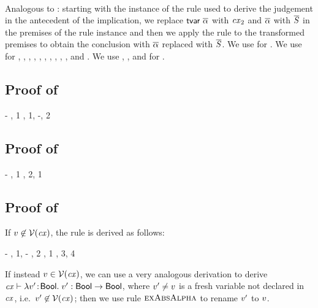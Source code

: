 \begin{bycase}
\Case{\restrules}\\
Analogous to \Rtbool: starting with the instance of the rule used to derive
the judgement in the antecedent of the implication, we replace
$\mathsf{tvar}\ \overline{\alpha}$ with $\mathit{cx}_2$ and $\overline{\alpha}$ with $\overline{S}$ in the premises of
the rule instance and then we apply the rule to the transformed premises to
obtain the conclusion with $\overline{\alpha}$ replaced with $\overline{S}$. We use
 for \Rtsub.
We use  for
\Rstrefl, \Rstarr, \Rstrec,
\Reif, \Redesc, \Rthifsbs, \Rthbool, \Rthext, \Rthif, \Rthrec,
and \Rthprojsub.
We use ,
, and  for
\Reabsalpha.

\end{bycase}



\subsection*{Proof of }

\begin{derivation}
\step{\cxwfO}
     {\hyp}
\step{\istyO{\bool}}
     {\Rtbool, 1}
\step{\cxwf{\snoc{\cx}{\vdec{\var}{\bool}}}}
     {\Rcxvdec, 1, \hyp, 2}
\end{derivation}



\subsection*{Proof of }

\begin{derivation}
\step{\hastyO{\expr}{\bool}}
     {\hyp}
\step{\cxwfO}
     {, 1}
\step{\cxwf{\snoc{\cx}{\axM{\expr}}}}
     {\Rcxax, 2, 1}
\end{derivation}



\subsection*{Proof of }

If $v\not\in\mathcal{V}(\mathit{cx})$, the rule is derived as follows:
\begin{derivation}
\step{\cxwfO}
     {\hyp}
\step{\cxwf{\snoc{\cx}{\vdec{\var}{\bool}}}}
     {\Rcxvdecbool, 1, \hyp}
\step{\hasty{\snoc{\cx}{\vdec{\var}{\bool}}}{\var}{\bool}}
     {\Revar, 2}
\step{\istyO{\bool}}
     {\Rtbool, 1}
\step{\hastyO{\abs{\var}{\bool}{\var}}{\tarr{\bool}{\bool}}}
     {\Reabs, 3, 4}
\end{derivation}
If instead $v\in\mathcal{V}(\mathit{cx})$, we can use a very analogous derivation to
derive $\mathit{cx}\vdash\lambda v'\!:\!\mathsf{Bool}.\;v':\mathsf{Bool}\to\mathsf{Bool}$, where
$v'\neq v$ is a fresh variable not declared in $\mathit{cx}$, i.e.\
$v'\not\in\mathcal{V}(\mathit{cx})$; then we use rule $\textsc{exAbsAlpha}$ to rename $v'$ to
$v$.



